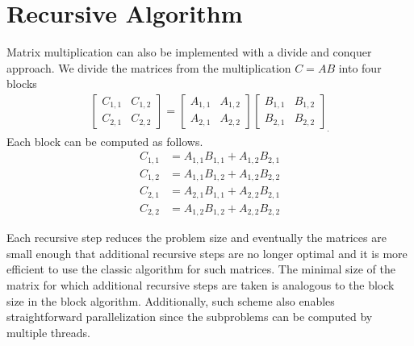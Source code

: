 \documentclass[a4paper,11pt]{article}
\begin{document}
\section{Recursive Algorithm}

Matrix multiplication can also be implemented with a divide and conquer approach\cite{Cormen2009}. We divide the matrices from the multiplication $C=AB$ into four blocks
\begin{align*}
\begin{bmatrix}
C_{1,1} & C_{1,2} \\
C_{2,1} & C_{2,2}
\end{bmatrix}
=
\begin{bmatrix}
A_{1,1} & A_{1,2} \\
A_{2,1} & A_{2,2}
\end{bmatrix}
\begin{bmatrix}
B_{1,1} & B_{1,2} \\
B_{2,1} & B_{2,2}
\end{bmatrix}
_{\text{.}}
\end{align*}
%
Each block can be computed as follows.
\begin{align*}
C_{1,1} &= A_{1,1}B_{1,1} + A_{1,2}B_{2,1} \\
C_{1,2} &= A_{1,1}B_{1,2} + A_{1,2}B_{2,2} \\
C_{2,1} &= A_{2,1}B_{1,1} + A_{2,2}B_{2,1} \\
C_{2,2} &= A_{1,2}B_{1,2} + A_{2,2}B_{2,2}
\end{align*}

Each recursive step reduces the problem size and eventually the matrices are small enough that additional recursive steps are no longer optimal and it is more efficient to use the classic algorithm for such matrices. The minimal size of the matrix for which additional recursive steps are taken is analogous to the block size in the block algorithm. Additionally, such scheme also enables straightforward parallelization since the subproblems can be computed by multiple threads.
\end{document}
